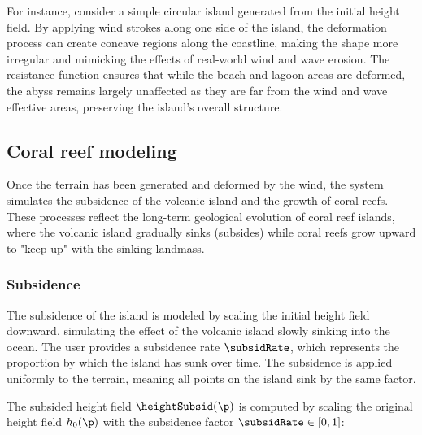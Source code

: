 For instance, consider a simple circular island generated from the initial height field. By applying wind strokes along one side of the island, the deformation process can create concave regions along the coastline, making the shape more irregular and mimicking the effects of real-world wind and wave erosion. The resistance function ensures that while the beach and lagoon areas are deformed, the abyss remains largely unaffected as they are far from the wind and wave effective areas, preserving the island's overall structure.




\subsection{Coral reef modeling}


Once the terrain has been generated and deformed by the wind, the system simulates the subsidence of the volcanic island and the growth of coral reefs. These processes reflect the long-term geological evolution of coral reef islands, where the volcanic island gradually sinks (subsides) while coral reefs grow upward to "keep-up" with the sinking landmass.

\subsubsection{Subsidence}

The subsidence of the island is modeled by scaling the initial height field downward, simulating the effect of the volcanic island slowly sinking into the ocean. The user provides a subsidence rate $\subsidRate$, which represents the proportion by which the island has sunk over time. The subsidence is applied uniformly to the terrain, meaning all points on the island sink by the same factor.

The subsided height field $\heightSubsid(\p)$ is computed by scaling the original height field $h_0(\p)$ with the subsidence factor $\subsidRate \in [0, 1]$:

